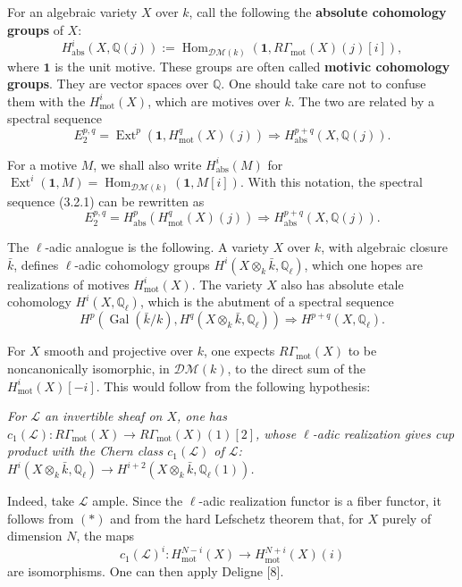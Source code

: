 \documentclass[11pt,a4paper]{article}
\theoremstyle{plain}
\theoremstyle{definition}
\DeclareMathOperator{\Ext}{Ext}
\DeclareMathOperator{\Hom}{Hom}
\DeclareMathOperator{\Gal}{Gal}
\newcommand{\Q}{\mathbb{Q}}
\DeclareMathOperator{\mot}{mot}
\newcommand{\abs}{\mathrm{abs}}
\begin{document}
\subsection{}

For an algebraic variety $X$ over $k$, call the following the \textbf{absolute cohomology groups} of $X$:
$$
H^i_{\abs}(X,\Q(j)):=\Hom_{\mathscr{D}\mathcal{M}(k)}(\mathbf{1},R\Gamma_{\mot}(X)(j)[i]),
$$
where $\mathbf{1}$ is the unit motive. These groups are often called \textbf{motivic cohomology groups}. They are vector spaces over $\Q$. One should take care not to confuse them with the $H^i_{\mot}(X)$, which are motives over $k$. The two are related by a spectral sequence
\begin{equation}
\tag{3.2.1}
E_2^{p,q}=\Ext^p(\mathbf{1},H^q_{\mot}(X)(j))\Rightarrow H^{p+q}_{\abs}(X,\Q(j)).
\end{equation}

For a motive $M$, we shall also write $H^i_{\abs}(M)$ for $\Ext^i(\mathbf{1},M)=\Hom_{\mathscr{D}\mathcal{M}(k)}(\mathbf{1},M[i])$. With this notation, the spectral sequence (3.2.1) can be rewritten as
\begin{equation}
\tag{3.2.2}
E_2^{p,q}=H^p_{\abs}(H^q_{\mot}(X)(j))\Rightarrow H^{p+q}_{\abs}(X,\Q(j)).
\end{equation}

The $\ell$-adic analogue is the following. A variety $X$ over $k$, with algebraic closure $\bar{k}$, defines $\ell$-adic cohomology groups $H^i(X\otimes_k\bar{k},\Q_\ell)$, which one hopes are realizations of motives $H^i_{\mot}(X)$. The variety $X$ also has absolute etale cohomology $H^i(X,\Q_\ell)$, which is the abutment of a spectral sequence
$$
H^p(\Gal(\bar{k}/k),H^q(X\otimes_k\bar{k},\Q_\ell))\Rightarrow H^{p+q}(X,\Q_\ell).
$$

For $X$ smooth and projective over $k$, one expects $R\Gamma_{\mot}(X)$ to be noncanonically isomorphic, in $\mathscr{D}\mathcal{M}(k)$, to the direct sum of the $H^i_{\mot}(X)[-i]$. This would follow from the following hypothesis:

\textit{For $\mathscr{L}$ an invertible sheaf on $X$, one has $c_1(\mathscr{L}):R\Gamma_{\mot}(X)\to R\Gamma_{\mot}(X)(1)[2]$, whose $\ell$-adic realization gives cup product with the Chern class $c_1(\mathscr{L})$ of $\mathscr{L}$: $H^i(X\otimes_k\bar{k},\Q_\ell)\to H^{i+2}(X\otimes_k\bar{k},\Q_\ell(1))$.}

Indeed, take $\mathscr{L}$ ample. Since the $\ell$-adic realization functor is a fiber functor, it follows from $(*)$ and from the hard Lefschetz theorem that, for $X$ purely of dimension $N$, the maps
$$
c_1(\mathscr{L})^i:H^{N-i}_{\mot}(X)\to H^{N+i}_{\mot}(X)(i)
$$
are isomorphisms. One can then apply Deligne [8].
\end{document}
